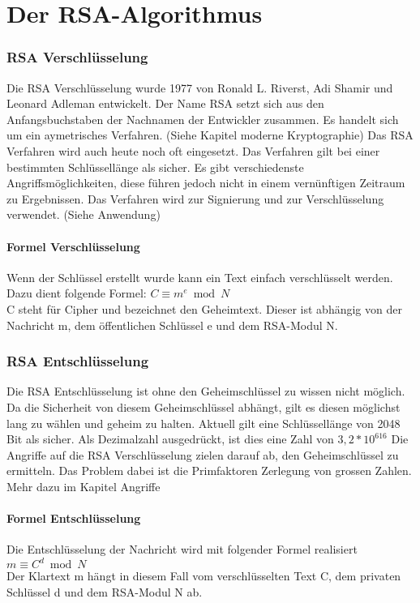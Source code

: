 \part{Der RSA-Algorithmus}



\section{RSA Verschlüsselung}
Die RSA Verschlüsselung wurde 1977 von Ronald L. Riverst, Adi Shamir und Leonard Adleman entwickelt. Der Name RSA setzt sich aus den Anfangsbuchstaben der Nachnamen der Entwickler zusammen. Es handelt sich um ein aymetrisches Verfahren. (Siehe Kapitel moderne Kryptographie) %
Das RSA Verfahren wird auch heute noch oft eingesetzt. Das Verfahren gilt bei einer bestimmten Schlüssellänge als sicher. Es gibt verschiedenste Angriffsmöglichkeiten, diese führen jedoch nicht in einem vernünftigen Zeitraum zu Ergebnissen. Das Verfahren wird zur Signierung und zur Verschlüsselung verwendet. (Siehe Anwendung) %

\subsection{Formel Verschlüsselung}
Wenn der Schlüssel erstellt wurde kann ein Text einfach verschlüsselt werden. Dazu dient folgende Formel:
$ C \equiv m^e  \bmod N $\\
C steht für Cipher und bezeichnet den Geheimtext. Dieser ist abhängig von der Nachricht m, dem öffentlichen Schlüssel e und dem RSA-Modul N.

\section{RSA Entschlüsselung}
Die RSA Entschlüsselung ist ohne den Geheimschlüssel zu wissen nicht möglich. Da die Sicherheit von diesem Geheimschlüssel abhängt, gilt es diesen möglichst lang zu wählen und geheim zu halten. Aktuell gilt eine Schlüssellänge von 2048 Bit als sicher. Als Dezimalzahl ausgedrückt, ist dies eine Zahl von $ 3,2 * 10^{616} $
Die Angriffe auf die RSA Verschlüsselung zielen darauf ab, den Geheimschlüssel zu ermitteln. Das Problem dabei ist die Primfaktoren Zerlegung von grossen Zahlen. Mehr dazu im Kapitel Angriffe %

\subsection{Formel Entschlüsselung}
Die Entschlüsselung der Nachricht wird mit folgender Formel realisiert
$ m \equiv C^d \bmod N $ \\
Der Klartext m hängt in diesem Fall vom verschlüsselten Text C, dem privaten Schlüssel d und dem RSA-Modul N ab. 
%
